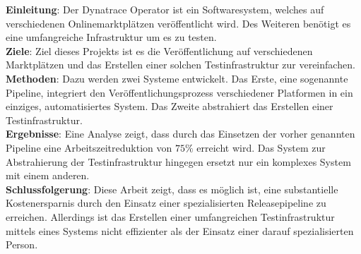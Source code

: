 \textbf{Einleitung}:
Der Dynatrace Operator ist ein Softwaresystem, welches auf verschiedenen Onlinemarktplätzen veröffentlicht wird.
Des Weiteren benötigt es eine umfangreiche Infrastruktur um es zu testen.\\
\textbf{Ziele}: Ziel dieses Projekts ist es die Veröffentlichung auf verschiedenen Marktplätzen und das Erstellen einer solchen Testinfrastruktur zur vereinfachen.\\
\textbf{Methoden}: Dazu werden zwei Systeme entwickelt.
Das Erste, eine sogenannte Pipeline, integriert den Veröffentlichungsprozess verschiedener Platformen in ein einziges, automatisiertes System.
Das Zweite abstrahiert das Erstellen einer Testinfrastruktur. \\
\textbf{Ergebnisse}: Eine Analyse zeigt, dass durch das Einsetzen der vorher genannten Pipeline eine Arbeitszeitreduktion von $75 \%$ erreicht wird.
Das System zur Abstrahierung der Testinfrastruktur hingegen ersetzt nur ein komplexes System mit einem anderen. \\
\textbf{Schlussfolgerung}: Diese Arbeit zeigt, dass es möglich ist, eine substantielle Kostenersparnis durch den Einsatz einer spezialisierten Releasepipeline zu erreichen.
Allerdings ist das Erstellen einer umfangreichen Testinfrastruktur mittels eines Systems nicht effizienter als der Einsatz einer darauf spezialisierten Person.

